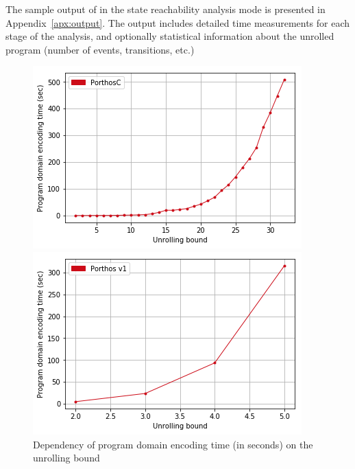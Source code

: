 
The sample output of \porthos[2] in the state reachability analysis mode is presented in Appendix~\ref{apx:output}.
The output includes detailed time measurements for each stage of the analysis, and optionally statistical information about the unrolled program (number of events, transitions, etc.)

\begin{figure}[t]
\begin{minipage}{.45\textwidth}
\includegraphics[width=\textwidth,keepaspectratio]{img/my/performance/unr-time-new.png}
\end{minipage}
\hfill
%
\begin{minipage}{.45\textwidth}
\includegraphics[width=\textwidth,keepaspectratio]{img/my/performance/unr-time-old.png}
\end{minipage}
%
\caption{Dependency of program domain encoding time (in seconds) on the unrolling bound}
\label{dep:time}
\end{figure}


